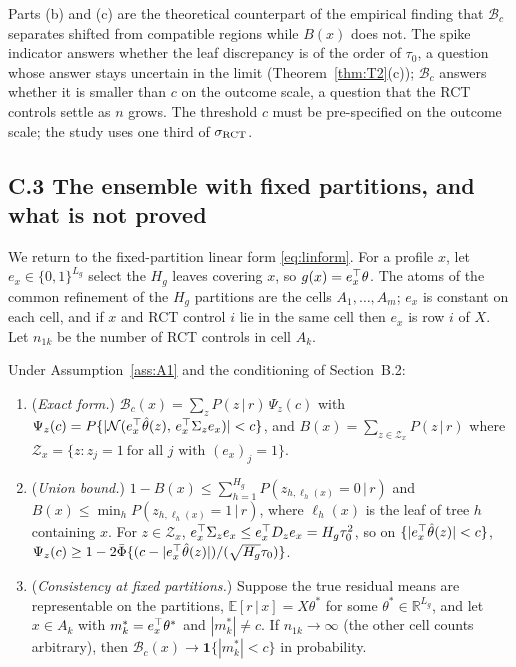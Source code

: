 \documentclass[11pt]{article}
\newcommand{\E}{\mathbb{E}}
\newcommand{\Normal}{\mathcal{N}}
\newcommand{\given}{\,\vert\,}
\theoremstyle{definition}
\theoremstyle{plain}
\begin{document}
{\begin{remA}\label{rem:whygmap}
Parts (b) and (c) are the theoretical counterpart of the empirical finding that $\mathcal B_c$ separates shifted from compatible regions while $B(x)$ does not. The spike indicator answers whether the leaf discrepancy is of the order of $\tau_0$, a question whose answer stays uncertain in the limit (Theorem~\ref{thm:T2}(c)); $\mathcal B_c$ answers whether it is smaller than $c$ on the outcome scale, a question that the RCT controls settle as $n$ grows. The threshold $c$ must be pre-specified on the outcome scale; the study uses one third of $\sigma_{\rm RCT}$.
\end{remA}

\subsection*{C.3 The ensemble with fixed partitions, and what is not proved}

We return to the fixed-partition linear form \eqref{eq:linform}. For a profile $x$, let $e_x\in\{0,1\}^{L_g}$ select the $H_g$ leaves covering $x$, so $g(x)=e_x^{\top}\theta$. The atoms of the common refinement of the $H_g$ partitions are the cells $A_1,\dots,A_m$; $e_x$ is constant on each cell, and if $x$ and RCT control $i$ lie in the same cell then $e_x$ is row $i$ of $X$. Let $n_{1k}$ be the number of RCT controls in cell $A_k$.

\begin{propA}\label{prop:ensemble}
Under Assumption~\ref{ass:A1} and the conditioning of Section~B.2:
\begin{enumerate}[label=(\alph*),leftmargin=2.2em]
\item (\emph{Exact form.}) $\mathcal B_c(x)=\sum_zP(z\given r)\,\Psi_z(c)$ with $\Psi_z(c)=P\{|\Normal(e_x\tr\hat\theta(z),\,e_x\tr\Sigma_ze_x)|<c\}$, and $B(x)=\sum_{z\in\mathcal Z_x}P(z\given r)$ where $\mathcal Z_x=\{z:z_j=1\ \text{for all }j\text{ with }(e_x)_j=1\}$.
\item (\emph{Union bound.}) $1-B(x)\le\sum_{h=1}^{H_g}P(z_{h,\ell_h(x)}=0\given r)$ and $B(x)\le\min_hP(z_{h,\ell_h(x)}=1\given r)$, where $\ell_h(x)$ is the leaf of tree $h$ containing $x$. For $z\in\mathcal Z_x$, $e_x^{\top}\Sigma_ze_x\le e_x^{\top} D_ze_x=H_g\tau_0^2$, so on $\{|e_x^{\top}\hat\theta(z)|<c\}$, $\Psi_z(c)\ge1-2\bar\Phi\{(c-|e_x^{\top}\hat\theta(z)|)/(\sqrt{H_g}\tau_0)\}$.
\item (\emph{Consistency at fixed partitions.}) Suppose the true residual means are representable on the partitions, $\E[r\given x]=X\theta^\ast$ for some $\theta^\ast\in\mathbb R^{L_g}$, and let $x\in A_k$ with $m_k^\ast=e_x^{\top}\theta^\ast$ and $|m_k^\ast|\ne c$. If $n_{1k}\to\infty$ (the other cell counts arbitrary), then $\mathcal B_c(x)\to\mathbf 1\{|m^\ast_k|<c\}$ in probability.
\end{enumerate}
\end{propA}

}
\end{document}
